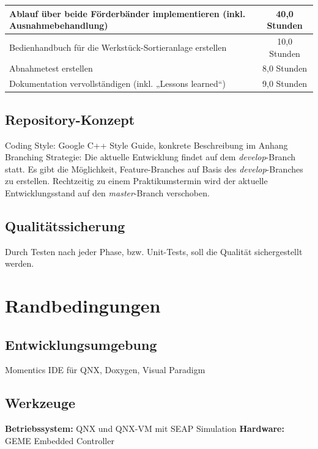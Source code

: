 \documentclass[oneside,a4paper,titlepage]{scrartcl} %
\begin{document}
\begin{small}
\begin{center}
\begin{tabular}{|l|c|}
             \hline
             Ablauf über beide Förderbänder implementieren (inkl. Ausnahmebehandlung) & 40,0 Stunden\\
             \hline
             Bedienhandbuch für die Werkstück-Sortieranlage erstellen & 10,0 Stunden\\
             \hline
             Abnahmetest erstellen & 8,0 Stunden\\
             \hline
             Dokumentation vervollständigen (inkl. „Lessons learned“) & 9,0 Stunden\\
             \hline
            \end{tabular}
        \end{center}
    \end{small}
    \newpage

\subsection{Repository-Konzept}
Coding Style: Google C++ Style Guide, konkrete Beschreibung im Anhang\newline
Branching Strategie: Die aktuelle Entwicklung findet auf dem \emph{develop}-Branch statt. Es gibt die Möglichkeit, Feature-Branches auf Basis des \emph{develop}-Branches zu erstellen. Rechtzeitig zu einem Praktikumstermin wird der aktuelle Entwicklungsstand auf den \emph{master}-Branch verschoben.  

\subsection{Qualitätssicherung}
Durch Testen nach jeder Phase, bzw. Unit-Tests, soll die Qualität sichergestellt werden.

\newpage

\section{Randbedingungen}

\subsection{Entwicklungsumgebung}
Momentics IDE für QNX, Doxygen, Visual Paradigm

\subsection{Werkzeuge}
\textbf{Betriebssystem:} QNX und QNX-VM mit SEAP Simulation\newline
\textbf{Hardware:} GEME Embedded Controller
\end{document}
